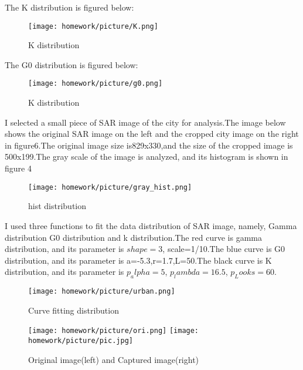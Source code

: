 \documentclass{article}
\begin{document}
	\par The K distribution is figured below:
	\begin{figure}[h] %
		\centering
		\texttt{[image: homework/picture/K.png]}
		\caption{K distribution}
	\end{figure}
	
	\par The G0 distribution is figured below:
	\begin{figure}[h] %
		\centering
		\texttt{[image: homework/picture/g0.png]}
		\caption{K distribution}
	\end{figure}
	
	\par I selected a small piece of SAR image of the city for analysis.The image below shows the original SAR image on the left and the cropped city image on the right in figure6.The original image size is829x330,and the size of the cropped image is 500x199.The gray scale of the image is analyzed, and its histogram is shown in figure 4
	
	\begin{figure}[h] %
    	\centering
    	\texttt{[image: homework/picture/gray\_hist.png]} 
    	\caption{ hist distribution}
    \end{figure}
	\par I used three functions to fit the data distribution of SAR image, namely, Gamma distribution G0 distribution and k distribution.The red curve is gamma distribution, and its parameter is $shape=3$, scale=1/10.The blue curve is G0 distribution, and its parameter is a=-5.3,r=1.7,L=50.The black curve is K distribution, and its parameter is $p_alpha=5$, $p_lambda=16.5$, $p_Looks=60$.
	
	\begin{figure}[h] %
    	\centering
    	\texttt{[image: homework/picture/urban.png]} 
    	\caption{Curve fitting distribution}
    \end{figure}

	\begin{figure}[h] %
		\centering
		\texttt{[image: homework/picture/ori.png]} %
		\texttt{[image: homework/picture/pic.jpg]}
		\caption{Original image(left) and Captured image(right)}
	\end{figure}
\end{document}
